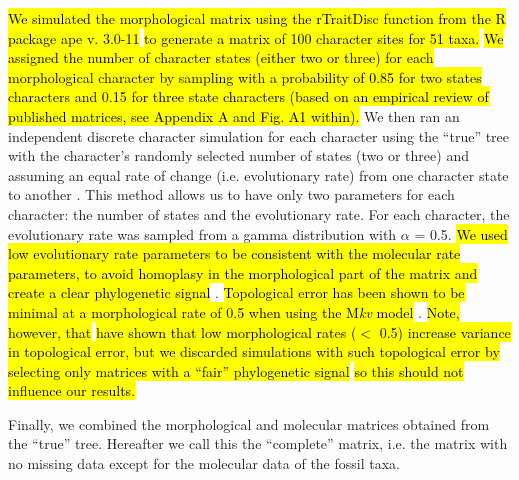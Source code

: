 \documentclass[12pt,letterpaper]{article}
\begin{document}
\hl{We simulated the morphological matrix using the rTraitDisc function from the R package ape v. 3.0-11} \citep{paradisape:2004}\hl{ to generate a matrix of 100 character sites for 51 taxa.}
\hl{We assigned the number of character states (either two or three) for each morphological character by sampling with a probability of 0.85 for two states characters and 0.15 for three state characters (based on an empirical review of published matrices, see Appendix A and Fig. A1 within).}
We then ran an independent discrete character simulation for each character using the ``true'' tree with the character's randomly selected number of states (two or three) and assuming an equal rate of change (i.e. evolutionary rate) from one character state to another \citep{Pagel22011994}.
This method allows us to have only two parameters for each character: the number of states and the evolutionary rate.
For each character, the evolutionary rate was sampled from a gamma distribution with $\alpha$ = 0.5.
\hl{We used low evolutionary rate parameters to be consistent with the molecular rate parameters, to avoid homoplasy in the morphological part of the matrix and create a clear phylogenetic signal }\citep{wrightbayesian2014}.
\hl{Topological error has been shown to be minimal at a morphological rate of 0.5 when using the M\textit{kv} model }\citep{lewisa2001,wrightbayesian2014}.
\hl{Note, however, that } \cite{wrightbayesian2014}\hl{ have shown that low morphological rates ($<$ 0.5) increase variance in topological error, but we discarded simulations with such topological error by selecting only matrices with a ``fair'' phylogenetic signal }\citep[\hl{see Estimating phylogenies section below;}][]{zanderminimal2004}\hl{ so this should not influence our results.}

Finally, we combined the morphological and molecular matrices obtained from the ``true'' tree.
Hereafter we call this the ``complete'' matrix, i.e. the matrix with no missing data except for the molecular data of the fossil taxa.
\end{document}
